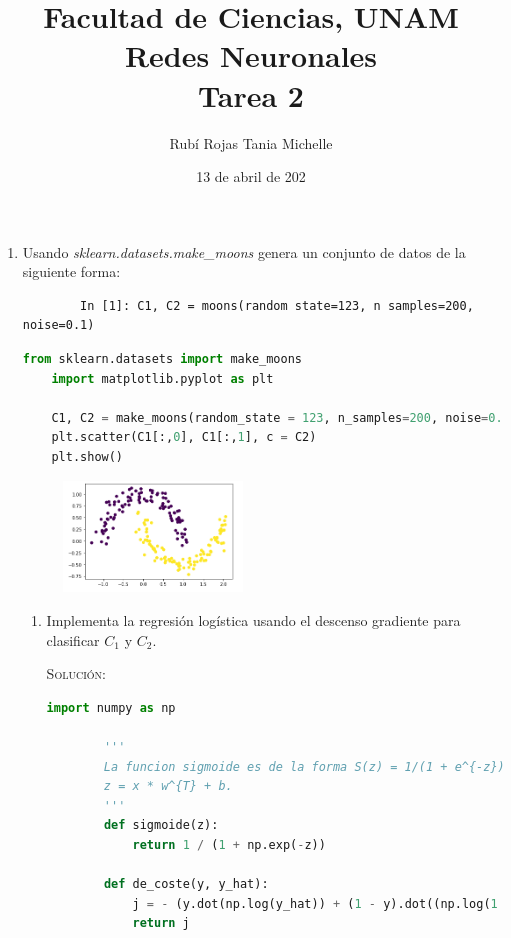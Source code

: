 \documentclass[letterpaper,11pt]{article}
\title{Facultad de Ciencias, UNAM \\ Redes Neuronales \\ Tarea 2}
\author{Rubí Rojas Tania Michelle}
\date{13 de abril de 202}
\begin{document}
\maketitle

\begin{enumerate}
    \item Usando \textit{sklearn.datasets.make\_moons} genera un conjunto de 
    datos de la siguiente forma:
    \begin{verbatim}
        In [1]: C1, C2 = moons(random state=123, n samples=200, noise=0.1)
    \end{verbatim}

    \begin{lstlisting}[language=Python]
    from sklearn.datasets import make_moons
    import matplotlib.pyplot as plt

    C1, C2 = make_moons(random_state = 123, n_samples=200, noise=0.1)
    plt.scatter(C1[:,0], C1[:,1], c = C2)
    plt.show()
    \end{lstlisting}

    \begin{figure}[ht]
        \centering
        \includegraphics[width=0.45\textwidth]{./imagenes/datos.png}
    \end{figure}            

    \begin{enumerate}
        \item Implementa la regresión logística usando el descenso gradiente 
        para clasificar $C_1$ y $C_2$.
        
        \textsc{Solución:}
        \begin{lstlisting}[language=Python]
        import numpy as np

        '''
        La funcion sigmoide es de la forma S(z) = 1/(1 + e^{-z}), donde 
        z = x * w^{T} + b. 
        '''
        def sigmoide(z):
            return 1 / (1 + np.exp(-z))

        def de_coste(y, y_hat):
            j = - (y.dot(np.log(y_hat)) + (1 - y).dot((np.log(1 - y_hat))))
            return j


\end{lstlisting}
\end{enumerate}
\end{enumerate}
\end{document}
